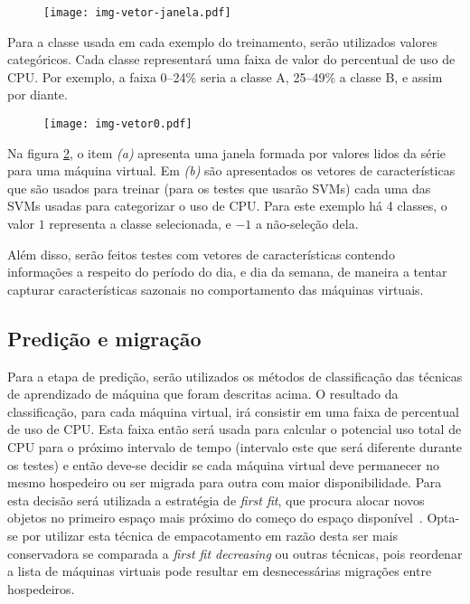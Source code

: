 \begin{figure}[htp]
\centering
\texttt{[image: img-vetor-janela.pdf]}
\label{fig:vetorjanela}
\end{figure}

Para a classe usada em cada exemplo do treinamento, serão utilizados
valores categóricos. Cada classe representará uma faixa de valor do
percentual de uso de CPU. Por exemplo, a faixa 0--24\% seria a classe
A, 25--49\% a classe B, e assim por diante.

\begin{figure}[htp]
\centering
\texttt{[image: img-vetor0.pdf]}
\label{fig:vetor0}
\end{figure}

Na figura \ref{fig:vetor0}, o item \emph{(a)} apresenta uma janela
formada por valores lidos da série para uma máquina virtual. Em \emph{(b)}
são apresentados os vetores de características que são usados para treinar
(para os testes que usarão SVMs) cada uma das SVMs usadas para categorizar
o uso de CPU. Para este exemplo há 4 classes, o valor $1$ representa a
classe selecionada, e $-1$ a não-seleção dela.

Além disso, serão feitos testes com vetores de características contendo
informações a respeito do período do dia, e dia da semana, de maneira a
tentar capturar características sazonais no comportamento das máquinas
virtuais.

\subsection{Predição e migração}

Para a etapa de predição, serão utilizados os métodos de classificação das
técnicas de aprendizado de máquina que foram descritas acima. O resultado da
classificação, para cada máquina virtual, irá consistir em uma faixa de
percentual de uso de CPU. Esta faixa então será usada para calcular o
potencial uso total de CPU para o próximo intervalo de tempo (intervalo este
que será diferente durante os testes) e então deve-se decidir se cada máquina
virtual deve permanecer no mesmo hospedeiro ou ser migrada para outra com maior
disponibilidade. Para esta decisão será utilizada a estratégia de \emph{first
fit}, que procura alocar novos objetos no primeiro espaço mais próximo do
começo do espaço disponível~\cite{yao1980new}. Opta-se por utilizar esta
técnica de empacotamento em razão desta ser mais conservadora se comparada a
\emph{first fit decreasing} ou outras técnicas, pois reordenar a lista de
máquinas virtuais pode resultar em desnecessárias migrações entre hospedeiros.

